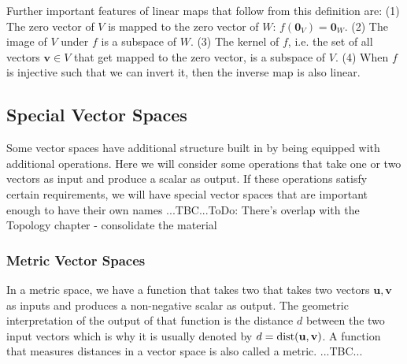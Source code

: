 \medskip
Further important features of linear maps that follow from this definition are: (1) The zero vector of $V$ is mapped to the zero vector of $W$: $f(\mathbf{0}_V) = \mathbf{0}_W$. (2) The image of $V$ under $f$ is a subspace of $W$. (3) The kernel of $f$, i.e. the set of all vectors $\mathbf{v} \in V$ that get mapped to the zero vector, is a subspace of $V$. (4) When $f$ is injective such that we can invert it, then the inverse map is also linear.







\subsection{Special Vector Spaces} 
Some vector spaces have additional structure built in by being equipped with additional operations. Here we will consider some operations that take one or two vectors as input and produce a scalar as output. If these operations satisfy certain requirements, we will have special vector spaces that are important enough to have their own names ...TBC...ToDo: There's overlap with the Topology chapter - consolidate the material

\subsubsection{Metric Vector Spaces}
In a metric space, we have a function that takes two that takes two vectors $\mathbf{u,v}$ as inputs and produces a non-negative scalar as output. The geometric interpretation of the output of that function is the distance $d$ between the two input vectors which is why it is usually denoted by $d = \operatorname{dist}(\mathbf{u,v})$. A function that measures distances in a vector space is also called a metric. ...TBC...

